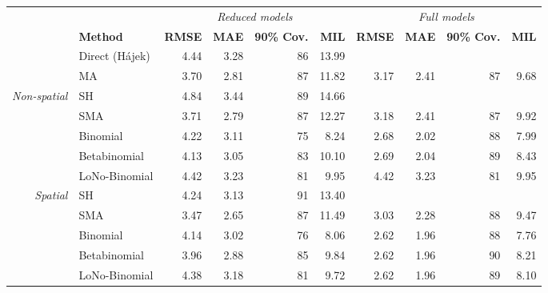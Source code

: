 
\begin{tabular}{r|l|rrrr|rrrr}
	\toprule
	& & \multicolumn{4}{c|}{\textit{Reduced models}} & \multicolumn{4}{c}{\textit{Full models}}\\
	& \textbf{Method} & \textbf{RMSE} & \textbf{MAE} & \textbf{90\% Cov.} & \textbf{MIL}& \textbf{RMSE} & \textbf{MAE} & \textbf{90\% Cov.}& \textbf{MIL}\\\cline{2-10}
	&Direct (Hájek) & 4.44 & 3.28 & 86 & 13.99&&&&\\
	&MA & 3.70 & 2.81 & 87 & 11.82& 3.17 & 2.41 & 87 & 9.68\\
	\midrule
	\multirow{5}{*}{\textit{Non-spatial}}&SH& 4.84 & 3.44 & 89 & 14.66&&&&\\
	&SMA & 3.71 & 2.79 & 87 & 12.27& 3.18 & 2.41 & 87 & 9.92\\
	&Binomial & 4.22 & 3.11 & 75 & 8.24& 2.68 & 2.02 & 88 & 7.99\\
	&Betabinomial & 4.13 & 3.05 & 83 & 10.10 & 2.69 & 2.04 & 89 & 8.43\\
	&LoNo-Binomial & 4.42 & 3.23 & 81 & 9.95& 4.42 & 3.23 & 81 & 9.95\\
	\midrule
	\multirow{5}{*}{\textit{Spatial}}&SH  & 4.24 & 3.13 & 91 & 13.40&&&&\\
	&SMA & 3.47 & 2.65 & 87 & 11.49& 3.03 & 2.28 & 88 & 9.47\\
	&Binomial & 4.14 & 3.02 & 76 & 8.06& 2.62 & 1.96 & 88 & 7.76\\
	&Betabinomial & 3.96 & 2.88 & 85 & 9.84& 2.62 & 1.96 & 90 & 8.21\\
	&LoNo-Binomial & 4.38 & 3.18 & 81 & 9.72& 2.62 & 1.96 & 89 & 8.10\\
	\bottomrule
\end{tabular}